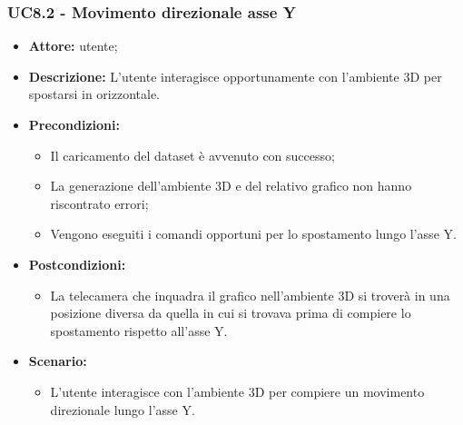 \subsubsection{UC8.2 - Movimento direzionale asse Y}
\begin{itemize}    
    \item \textbf{Attore:} utente;
    \item \textbf{Descrizione:} L'utente interagisce opportunamente con l'ambiente 3D per spostarsi in orizzontale.
    \item \textbf{Precondizioni:}    
        \begin{itemize}
            \item Il caricamento del dataset è avvenuto con successo;
            \item La generazione dell'ambiente 3D e del relativo grafico non hanno riscontrato errori;
            \item Vengono eseguiti i comandi opportuni per lo spostamento lungo l'asse Y.
        \end{itemize}    
    \item \textbf{Postcondizioni:}
        \begin{itemize}
            \item La telecamera che inquadra il grafico nell'ambiente 3D si troverà in una posizione diversa da quella in cui si trovava prima di compiere lo spostamento rispetto all'asse Y.
        \end{itemize}    
    \item \textbf{Scenario:} 
        \begin{itemize}
            \item L'utente interagisce con l'ambiente 3D per compiere un movimento direzionale lungo l'asse Y.
        \end{itemize}
\end{itemize}
